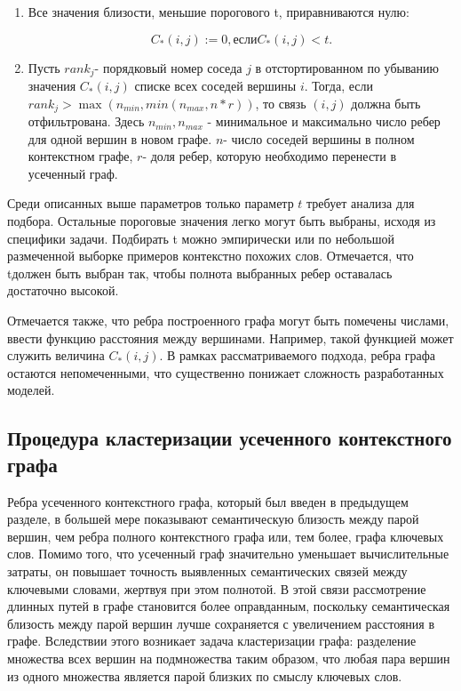 \begin{enumerate}
    \item Все значения близости, меньшие порогового  t, приравниваются нулю:

        $$C_{*}(i,j):=0, если C_{*}(i,j) < t. $$
    \item Пусть $rank_j$- порядковый номер соседа $j$ в отстортированном по убыванию значения $C_{*}(i,j)$ списке всех соседей вершины $i$. Тогда, если $rank_j >\max(n_{min},min(n_{max},n * r))$, то связь $(i,j)$ должна быть отфильтрована. Здесь $n_{min},n_{max}$ - минимальное и максимально число ребер для одной вершин в новом графе. $n$- число соседей вершины в полном контекстном графе, $r$- доля ребер, которую необходимо перенести в усеченный граф.
\end{enumerate}

Среди описанных выше параметров только параметр $t$ требует анализа для подбора. Остальные пороговые значения легко могут быть выбраны, исходя из специфики задачи. Подбирать t можно эмпирически или по небольшой размеченной выборке примеров контекстно похожих слов. Отмечается, что tдолжен быть выбран так, чтобы полнота выбранных ребер оставалась достаточно высокой.

Отмечается также, что ребра построенного графа могут быть помечены числами, ввести функцию расстояния между вершинами. Например, такой функцией может служить величина $C_{*}(i,j)$. В рамках рассматриваемого подхода, ребра графа остаются непомеченными, что существенно понижает сложность разработанных моделей.

\subsection{Процедура кластеризации усеченного контекстного графа}
Ребра усеченного контекстного графа, который был введен в предыдущем разделе, в большей мере показывают семантическую близость между парой вершин, чем ребра полного контекстного графа или, тем более, графа ключевых слов. Помимо того, что усеченный граф значительно уменьшает вычислительные затраты, он повышает точность выявленных семантических связей между ключевыми словами, жертвуя при этом полнотой. В этой связи рассмотрение длинных путей в графе становится более оправданным, поскольку семантическая близость между парой вершин лучше сохраняется с увеличением расстояния в графе. Вследствии этого возникает задача кластеризации графа: разделение множества всех вершин на подмножества таким образом, что любая пара вершин из одного множества является парой близких по смыслу ключевых слов. 


